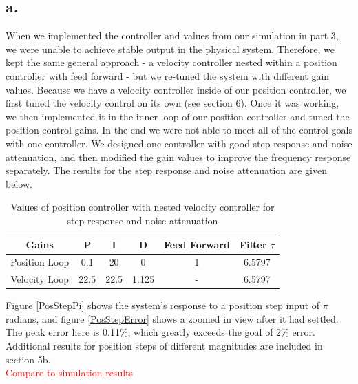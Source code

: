 \documentclass{article}
\newcommand{\xxx}[1]{\textcolor{red}{#1}}
\theoremstyle{plain}
\theoremstyle{definition}
\theoremstyle{remark}
\begin{document}
\subsection*{a.}
When we implemented the controller and values from our simulation in part 3, we were unable to achieve stable output in the physical system. Therefore, we kept the same general approach - a velocity controller nested within a position controller with feed forward - but we re-tuned the system with different gain values. Because we have a velocity controller inside of our position controller, we first tuned the velocity control on its own (see section 6). Once it was working, we then implemented it in the inner loop of our position controller and tuned the position control gains. In the end we were not able to meet all of the control goals with one controller. We designed one controller with good step response and noise attenuation, and then modified the gain values to improve the frequency response separately. The results for the step response and noise attenuation are given below.\\


\begin{table}[htb]
\begin{center}
    \begin{tabular}{|c|c|c|c|c|c|}
        \hline
        Gains & P   & I & D   & Feed Forward   & Filter $\tau$   \\ \hline
        Position Loop            & 0.1 & 20  & 0 & 1 & 6.5797    \\ 
        Velocity Loop       & 22.5   & 22.5    & 1.125   & -  & 6.5797  \\ 
       \hline
    \end{tabular}
\end{center}
\caption{Values of position controller with nested velocity controller for step response and noise attenuation}
\label{positionGains}
\end{table}

Figure \ref{PosStepPi} shows the system's response to a position step input of $\pi$ radians, and figure \ref{PosStepError} shows a zoomed in view after it had settled. The peak error here is 0.11\%, which greatly exceeds the goal of 2\% error. Additional results for position steps of different magnitudes are included in section 5b.\\

\xxx{Compare to simulation results}
\end{document}
